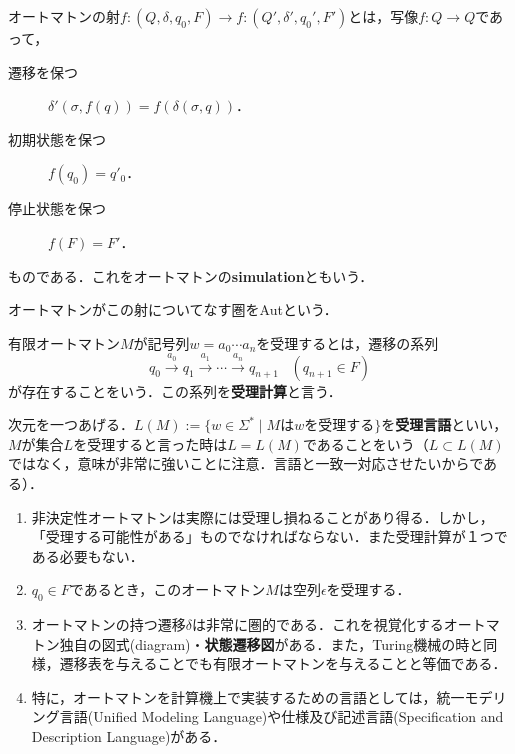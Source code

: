 \documentclass[uplatex, dvipdfmx]{jsreport}
\begin{document}
\begin{definition}[オートマトンの射と圏]
    オートマトンの射$f:(Q,\delta,q_0,F)\to f:(Q',\delta',q_0',F')$とは，写像$f:Q\to Q$であって，
    \begin{description}
        \item[遷移を保つ] $\delta'(\sigma,f(q))=f(\delta(\sigma,q))$．
        \item[初期状態を保つ] $f(q_0)=q'_0$．
        \item[停止状態を保つ] $f(F)=F'$．  
    \end{description}
    ものである．これをオートマトンの\textbf{simulation}ともいう．

    オートマトンがこの射についてなす圏をAutという．
\end{definition}

\begin{definition}
    有限オートマトン$M$が記号列$w=a_0\cdots a_n$を受理するとは，遷移の系列
    \[ q_0\xrightarrow{a_0}q_1\xrightarrow{a_1}\cdots\xrightarrow{a_n}q_{n+1}\;\;\;(q_{n+1}\in F) \]
    が存在することをいう．この系列を\textbf{受理計算}と言う．

    次元を一つあげる．$L(M):=\{w\in\Sigma^*\mid Mはwを受理する\}$を\textbf{受理言語}といい，
    $M$が集合$L$を受理すると言った時は$L=L(M)$であることをいう（$L\subset L(M)$ではなく，意味が非常に強いことに注意．言語と一致一対応させたいからである）．
\end{definition}

\begin{remark}\mbox{}
    \begin{enumerate}
        \item 非決定性オートマトンは実際には受理し損ねることがあり得る．しかし，「受理する可能性がある」ものでなければならない．また受理計算が１つである必要もない．
        \item $q_0\in F$であるとき，このオートマトン$M$は空列$\epsilon$を受理する．
        \item オートマトンの持つ遷移$\delta$は非常に圏的である．これを視覚化するオートマトン独自の図式(diagram)・\textbf{状態遷移図}がある．また，Turing機械の時と同様，遷移表を与えることでも有限オートマトンを与えることと等価である．
        \item 特に，オートマトンを計算機上で実装するための言語としては，統一モデリング言語(Unified Modeling Language)や仕様及び記述言語(Specification and Description Language)がある．
    \end{enumerate}
\end{remark}
\end{document}
